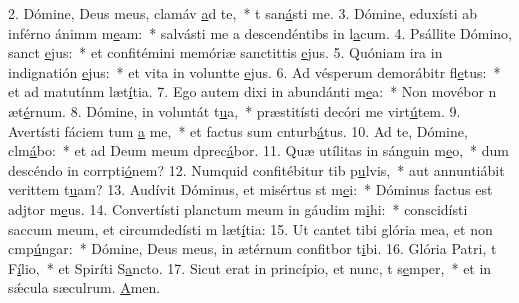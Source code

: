 2. Dómine, Deus meus, clamáv \uline{a}d te,~* t san\uline{á}sti me.
3. Dómine, eduxísti ab inférno ánimm m\uline{e}am:~* salvásti me a descendéntibs in l\uline{a}cum.
4. Psállite Dómino, sanct \uline{e}jus:~* et confitémini memóriæ sanctittis \uline{e}jus.
5. Quóniam ira in indignatión \uline{e}jus:~* et vita in voluntte \uline{e}jus.
6. Ad vésperum demorábitr fl\uline{e}tus:~* et ad matutínm læt\uline{í}tia.
7. Ego autem dixi in abundánti m\uline{e}a:~* Non movébor n æt\uline{é}rnum.
8. Dómine, in voluntát t\uline{u}a,~* præstitísti decóri me virt\uline{ú}tem.
9. Avertísti fáciem tum \uline{a} me,~* et factus sum cnturb\uline{á}tus.
10. Ad te, Dómine, clm\uline{á}bo:~* et ad Deum meum dprec\uline{á}bor.
11. Quæ utílitas in sánguin m\uline{e}o,~* dum descéndo in corrpti\uline{ó}nem?
12. Numquid confitébitur tib p\uline{u}lvis,~* aut annuntiábit verittem t\uline{u}am?
13. Audívit Dóminus, et misértus st m\uline{e}i:~* Dóminus factus est adjtor m\uline{e}us.
14. Convertísti planctum meum in gáudim m\uline{i}hi:~* conscidísti saccum meum, et circumdedísti m læt\uline{í}tia:
15. Ut cantet tibi glória mea, et non cmp\uline{ú}ngar:~* Dómine, Deus meus, in ætérnum confitbor t\uline{i}bi.
16. Glória Patri, t F\uline{í}lio,~* et Spiríti S\uline{a}ncto.
17. Sicut erat in princípio, et nunc, t s\uline{e}mper,~* et in sǽcula sæculrum. \uline{A}men.
